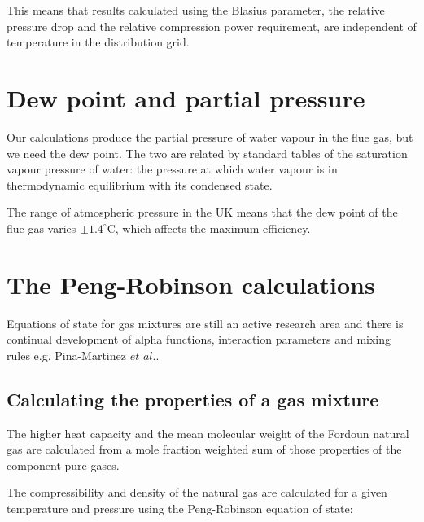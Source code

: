\documentclass[5p]{elsarticle} %
\begin{document}
This means that results calculated using the Blasius parameter, the relative pressure drop and the relative compression power requirement, are independent of temperature in the distribution grid.

\section{Dew point and partial pressure}
\label{sec:partial pressure}
Our calculations produce the partial pressure of water vapour in the flue gas, but we need the dew point. The two are related by standard tables of the saturation vapour pressure of water\citep{Perry2008}: the pressure at which water vapour is in thermodynamic equilibrium with its condensed state.

The range of atmospheric pressure in the UK means that the dew point of the flue gas varies  $\pm1.4^\circ$C, which affects the maximum efficiency.

\section{The Peng-Robinson calculations}

Equations of state for gas mixtures are still an active research area\citep{Lozana2022} and there is continual development of alpha functions, interaction parameters and mixing rules e.g. Pina-Martinez $et$ $al.$\citep{Pina-Martinez2019}.

\subsection{Calculating the properties of a gas mixture}
\label{sec:gasmix}
The higher heat capacity and the mean molecular weight of the Fordoun natural gas are calculated from a mole fraction weighted sum of those properties of the component pure gases.

The compressibility and density of the natural gas are calculated for a given temperature and pressure using the Peng-Robinson equation of state: 
\end{document}
